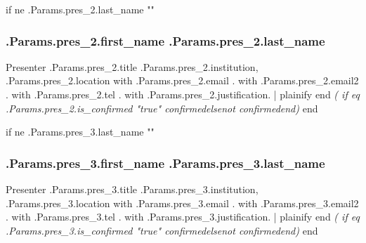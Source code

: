 \documentclass{report}
\begin{document}
              {{ if ne .Params.pres_2.last_name "" }}
                \subsubsection*{ {{.Params.pres_2.first_name}} {{.Params.pres_2.last_name}} }
                Presenter\newline
                {{.Params.pres_2.title}}\newline
                {{.Params.pres_2.institution}}, {{.Params.pres_2.location}}
                \newline
                {{ with .Params.pres_2.email }}{{.}}
                {{ with .Params.pres_2.email2 }}{{.}}
                {{ with .Params.pres_2.tel }}{{.}}
                \newline
                \newline
                {{ with .Params.pres_2.justification}}{{. | plainify }}{{ end }}
                \emph{ ({{ if eq .Params.pres_2.is_confirmed "true" }}confirmed{{else}}not confirmed{{end}}) }
              {{ end }}

              {{ if ne .Params.pres_3.last_name "" }}
                \subsubsection*{ {{.Params.pres_3.first_name}} {{.Params.pres_3.last_name}} }
                Presenter\newline
                {{.Params.pres_3.title}}\newline
                {{.Params.pres_3.institution}}, {{.Params.pres_3.location}}
                \newline
                {{ with .Params.pres_3.email }}{{.}}
                {{ with .Params.pres_3.email2 }}{{.}}
                {{ with .Params.pres_3.tel }}{{.}}
                \newline
                \newline
                {{ with .Params.pres_3.justification}}{{. | plainify }}{{ end }}
                \emph{ ({{ if eq .Params.pres_3.is_confirmed "true" }}confirmed{{else}}not confirmed{{end}}) }
              {{ end }}
\end{document}

